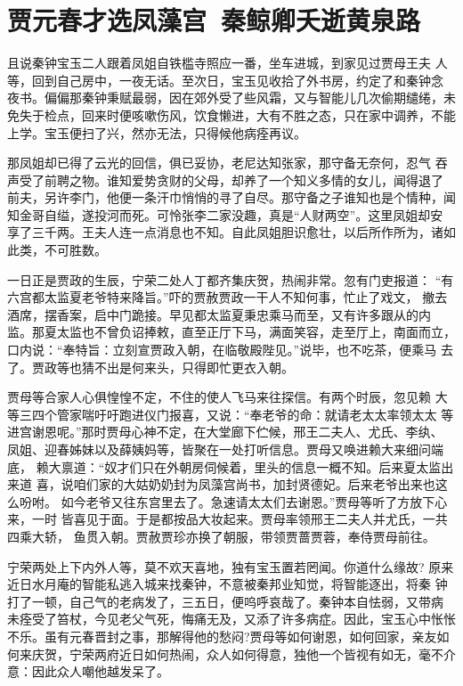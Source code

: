 \chapter{贾元春才选凤藻宫~秦鲸卿夭逝黄泉路}

且说秦钟宝玉二人跟着凤姐自铁槛寺照应一番，坐车进城，到家见过贾母王夫
人等，回到自己房中，一夜无话。至次日，宝玉见收拾了外书房，约定了和秦钟念
夜书。偏偏那秦钟秉赋最弱，因在郊外受了些风霜，又与智能儿几次偷期缱绻，未
免失于检点，回来时便咳嗽伤风，饮食懒进，大有不胜之态，只在家中调养，不能
上学。宝玉便扫了兴，然亦无法，只得候他病痊再议。

那凤姐却已得了云光的回信，俱已妥协，老尼达知张家，那守备无奈何，忍气
吞声受了前聘之物。谁知爱势贪财的父母，却养了一个知义多情的女儿，闻得退了
前夫，另许李门，他便一条汗巾悄悄的寻了自尽。那守备之子谁知也是个情种，闻
知金哥自缢，遂投河而死。可怜张李二家没趣，真是“人财两空”。这里凤姐却安
享了三千两。王夫人连一点消息也不知。自此凤姐胆识愈壮，以后所作所为，诸如
此类，不可胜数。

一日正是贾政的生辰，宁荣二处人丁都齐集庆贺，热闹非常。忽有门吏报道：
“有六宫都太监夏老爷特来降旨。”吓的贾赦贾政一干人不知何事，忙止了戏文，
撤去酒席，摆香案，启中门跪接。早见都太监夏秉忠乘马而至，又有许多跟从的内
监。那夏太监也不曾负诏捧敕，直至正厅下马，满面笑容，走至厅上，南面而立，
口内说：“奉特旨：立刻宣贾政入朝，在临敬殿陛见。”说毕，也不吃茶，便乘马
去了。贾政等也猜不出是何来头，只得即忙更衣入朝。

贾母等合家人心俱惶惶不定，不住的使人飞马来往探信。有两个时辰，忽见赖
大等三四个管家喘吁吁跑进仪门报喜，又说：“奉老爷的命：就请老太太率领太太
等进宫谢恩呢。”那时贾母心神不定，在大堂廊下伫候，邢王二夫人、尤氏、李纨、
凤姐、迎春姊妹以及薛姨妈等，皆聚在一处打听信息。贾母又唤进赖大来细问端底，
赖大禀道：“奴才们只在外朝房伺候着，里头的信息一概不知。后来夏太监出来道
喜，说咱们家的大姑奶奶封为凤藻宫尚书，加封贤德妃。后来老爷出来也这么吩咐。
如今老爷又往东宫里去了。急速请太太们去谢恩。”贾母等听了方放下心来，一时
皆喜见于面。于是都按品大妆起来。贾母率领邢王二夫人并尤氏，一共四乘大轿，
鱼贯入朝。贾赦贾珍亦换了朝服，带领贾蔷贾蓉，奉侍贾母前往。

宁荣两处上下内外人等，莫不欢天喜地，独有宝玉置若罔闻。你道什么缘故?
原来近日水月庵的智能私逃入城来找秦钟，不意被秦邦业知觉，将智能逐出，将秦
钟打了一顿，自己气的老病发了，三五日，便呜呼哀哉了。秦钟本自怯弱，又带病
未痊受了笞杖，今见老父气死，悔痛无及，又添了许多病症。因此，宝玉心中怅怅
不乐。虽有元春晋封之事，那解得他的愁闷?贾母等如何谢恩，如何回家，亲友如
何来庆贺，宁荣两府近日如何热闹，众人如何得意，独他一个皆视有如无，毫不介
意：因此众人嘲他越发呆了。

